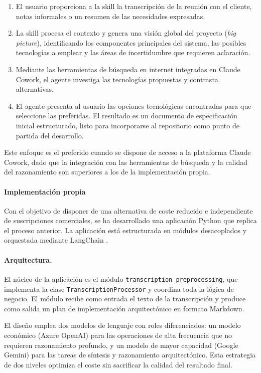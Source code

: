 \documentclass[11pt, letterpaper]{article}
\begin{document}
\begin{enumerate}
    \item El usuario proporciona a la skill la transcripción de la reunión con el cliente, notas informales o un resumen de las necesidades expresadas.
    \item La skill procesa el contexto y genera una visión global del proyecto (\textit{big picture}), identificando los componentes principales del sistema, las posibles tecnologías a emplear y las áreas de incertidumbre que requieren aclaración.
    \item Mediante las herramientas de búsqueda en internet integradas en Claude Cowork, el agente investiga las tecnologías propuestas y contrasta alternativas.
    \item El agente presenta al usuario las opciones tecnológicas encontradas para que seleccione las preferidas. El resultado es un documento de especificación inicial estructurado, listo para incorporarse al repositorio como punto de partida del desarrollo.
\end{enumerate}

Este enfoque es el preferido cuando se dispone de acceso a la plataforma Claude Cowork, dado que la integración con las herramientas de búsqueda y la calidad del razonamiento son superiores a los de la implementación propia.

\newpage

\paragraph{Implementación propia}
\label{sec:implementacion_propia_tr}
Con el objetivo de disponer de una alternativa de coste reducido e independiente de suscripciones comerciales, se ha desarrollado una aplicación Python que replica el proceso anterior. La aplicación está estructurada en módulos desacoplados y orquestada mediante LangChain \cite{langchain_2022}.

\paragraph{Arquitectura.}
El núcleo de la aplicación es el módulo \texttt{transcription\_preprocessing}, que implementa la clase \texttt{TranscriptionProcessor} y coordina toda la lógica de negocio. El módulo recibe como entrada el texto de la transcripción y produce como salida un plan de implementación arquitectónico en formato Markdown.

El diseño emplea dos modelos de lenguaje con roles diferenciados: un modelo económico (Azure OpenAI) para las operaciones de alta frecuencia que no requieren razonamiento profundo, y un modelo de mayor capacidad (Google Gemini) para las tareas de síntesis y razonamiento arquitectónico. Esta estrategia de dos niveles optimiza el coste sin sacrificar la calidad del resultado final.
\end{document}
